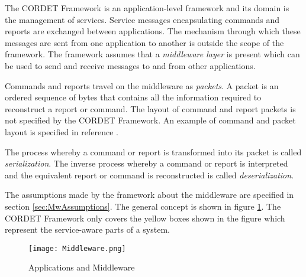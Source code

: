 The CORDET Framework is an application-level framework and its domain is the management of services. Service messages encapsulating commands and reports are exchanged between applications. The mechanism through which these messages are sent from one application to another is outside the scope of the framework. The framework assumes that a \textit{middleware layer} is present which can be used to send and receive messages to and from other applications. 

Commands and reports travel on the middleware as \textit{packets}. A packet is an ordered sequence of bytes that contains all the information required to reconstruct a report or command. The layout of command and report packets is not specified by the CORDET Framework. An example of command and packet layout is specified in reference \cite{ref:pus}.

The process whereby a command or report is transformed into its packet is called \textit{serialization}. The inverse process whereby a command or report is interpreted and the equivalent report or command is reconstructed is called \textit{deserialization}.

The assumptions made by the framework about the middleware are specified in section \ref{sec:MwAssumptions}. The general concept is shown in figure \ref{fig:Middleware}. The CORDET Framework only covers the yellow boxes shown in the figure which represent the service-aware parts of a system.

\begin{figure}[ht]
 \centering
 \texttt{[image: Middleware.png]}
 \caption{Applications and Middleware}
 \label{fig:Middleware}
\end{figure}
